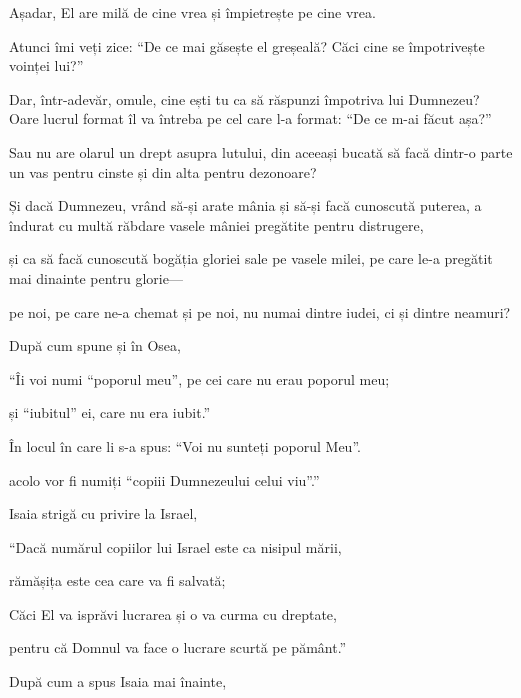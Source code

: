 {Așadar, El are milă de cine vrea și împietrește pe cine vrea.


\par }{\PP {}Atunci îmi veți zice: “De ce mai găsește el greșeală? Căci cine se împotrivește voinței lui?”

Dar, într-adevăr, omule, cine ești tu ca să răspunzi împotriva lui Dumnezeu? Oare lucrul format îl va întreba pe cel care l-a format: “De ce m-ai făcut așa?”

Sau nu are olarul un drept asupra lutului, din aceeași bucată să facă dintr-o parte un vas pentru cinste și din alta pentru dezonoare?

Și dacă Dumnezeu, vrând să-și arate mânia și să-și facă cunoscută puterea, a îndurat cu multă răbdare vasele mâniei pregătite pentru distrugere,

și ca să facă cunoscută bogăția gloriei sale pe vasele milei, pe care le-a pregătit mai dinainte pentru glorie—

pe noi, pe care ne-a chemat și pe noi, nu numai dintre iudei, ci și dintre neamuri?

După cum spune și în Osea,

\par }{\Q “Îi voi numi “poporul meu”, pe cei care nu erau poporul meu;

\par }{\QB și “iubitul” ei, care nu era iubit.”


\par }{\Q {}În locul în care li s-a spus: “Voi nu sunteți poporul Meu”.

\par }{\QB acolo vor fi numiți “copiii Dumnezeului celui viu”.”


\par }{\PP {}Isaia strigă cu privire la Israel,

\par }{\Q “Dacă numărul copiilor lui Israel este ca nisipul mării,

\par }{\QB rămășița este cea care va fi salvată;


\par }{\Q {}Căci El va isprăvi lucrarea și o va curma cu dreptate,

\par }{\QB pentru că Domnul va face o lucrare scurtă pe pământ.”


\par }{\PP {}După cum a spus Isaia mai înainte,

}
